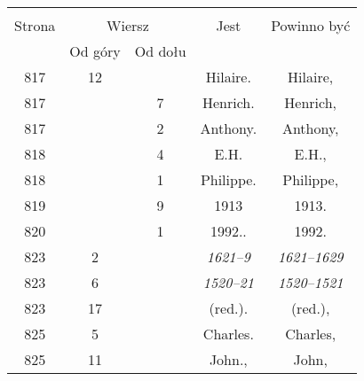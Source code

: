 \documentclass[a4paper,11pt]{article}
\begin{document}
\begin{center}
  \begin{tabular}{|c|c|c|c|c|}
    \hline
    & \multicolumn{2}{c|}{} & & \\
    Strona & \multicolumn{2}{c|}{Wiersz} & Jest
                              & Powinno być \\ \cline{2-3}
    & Od góry & Od dołu & & \\
    \hline
    817 & 12 & & Hilaire. & Hilaire, \\
    817 & &  7 & Henrich. & Henrich, \\
    817 & &  2 & Anthony. & Anthony, \\
    818 & &  4 & E.H. & E.H., \\
    818 & &  1 & Philippe. & Philippe, \\
    819 & &  9 & 1913 & 1913. \\
    820 & &  1 & 1992.. & 1992. \\
    823 &  2 & & \emph{1621--9} & \emph{1621--1629} \\
    823 &  6 & & \emph{1520--21} & \emph{1520--1521} \\
    823 & 17 & & (red.). & (red.), \\
    825 &  5 & & Charles. & Charles, \\
    825 & 11 & & John., & John, \\

\end{tabular}
\end{center}
\end{document}

